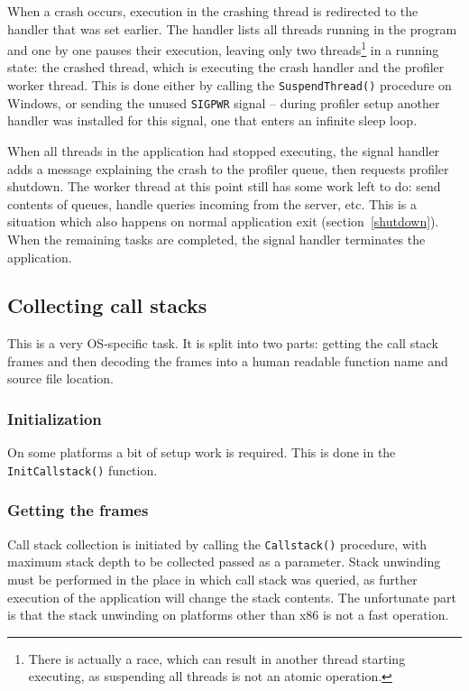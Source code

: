 \documentclass[hidelinks,titlepage,a4paper]{article}
\begin{document}
When a crash occurs, execution in the crashing thread is redirected to the handler that was set earlier. The handler lists all threads running in the program and one by one pauses their execution, leaving only two threads\footnote{There is actually a race, which can result in another thread starting executing, as suspending all threads is not an atomic operation.} in a running state: the crashed thread, which is executing the crash handler and the profiler worker thread. This is done either by calling the \texttt{SuspendThread()} procedure on Windows, or sending the unused \texttt{SIGPWR} signal -- during profiler setup another handler was installed for this signal, one that enters an infinite sleep loop.

When all threads in the application had stopped executing, the signal handler adds a message explaining the crash to the profiler queue, then requests profiler shutdown. The worker thread at this point still has some work left to do: send contents of queues, handle queries incoming from the server, etc. This is a situation which also happens on normal application exit (section~\ref{shutdown}). When the remaining tasks are completed, the signal handler terminates the application.

\subsection{Collecting call stacks}
\label{collectingcallstacks}

This is a very OS-specific task. It is split into two parts: getting the call stack frames and then decoding the frames into a human readable function name and source file location.

\subsubsection{Initialization}

On some platforms a bit of setup work is required. This is done in the \texttt{InitCallstack()} function.

\subsubsection{Getting the frames}

Call stack collection is initiated by calling the \texttt{Callstack()} procedure, with maximum stack depth to be collected passed as a parameter. Stack unwinding must be performed in the place in which call stack was queried, as further execution of the application will change the stack contents. The unfortunate part is that the stack unwinding on platforms other than x86 is not a fast operation.
\end{document}
